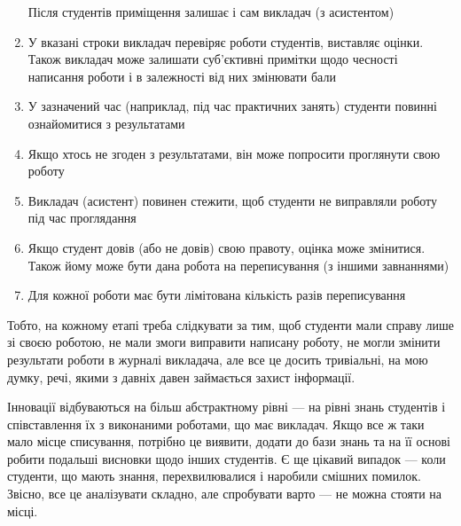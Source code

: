 \begin{enumerate}
        Після студентів приміщення залишає і сам викладач (з асистентом)
    \item
        У вказані строки викладач перевіряє роботи студентів, виставляє оцінки.
        Також викладач може залишати суб’єктивні примітки щодо чесності
        написання роботи і в залежності від них змінювати бали
    \item
        У зазначений час (наприклад, під час практичних занять) студенти повинні
        ознайомитися з результатами
    \item
        Якщо хтось не згоден з результатами, він може попросити проглянути свою
        роботу
    \item
        Викладач (асистент) повинен стежити, щоб студенти не виправляли роботу
        під час проглядання
    \item
        Якщо студент довів (або не довів) свою правоту, оцінка може змінитися.
        Також йому може бути дана робота на переписування (з іншими завнаннями)
    \item
        Для кожної роботи має бути лімітована кількість разів переписування
\end{enumerate}

Тобто, на кожному етапі треба слідкувати за тим, щоб студенти мали справу лише
зі своєю роботою, не мали змоги виправити написану роботу, не могли змінити
результати роботи в журналі викладача, але все це досить тривіальні, на мою
думку, речі, якими з давніх давен займається захист інформації.

Інновації відбуваються на більш абстрактному рівні --- на рівні знань студентів
і співставлення їх з виконаними роботами, що має викладач.
Якщо все ж таки мало місце списування, потрібно це виявити, додати до бази знань
та на її основі робити подальші висновки щодо інших студентів.
Є ще цікавий випадок --- коли студенти, що мають знання, перехвилювалися і
наробили смішних помилок.
Звісно, все це аналізувати складно, але спробувати варто --- не можна стояти на
місці.
